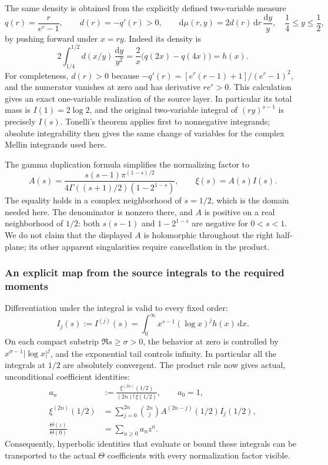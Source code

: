 \documentclass[11pt,a4paper]{article}
\numberwithin{equation}{section}
\theoremstyle{definition}
\theoremstyle{remark}
\begin{document}
The same density is obtained from the explicitly defined two-variable measure
\begin{equation}\label{hyp-eq:gp-pushforward}
q(r)=\frac{r}{e^r-1},\qquad d(r)=-q'(r)>0,\qquad
\mathrm d\mu(r,y)=2d(r)\,\mathrm dr\,\frac{\mathrm dy}{y},
\quad \frac14\leq y\leq\frac12,
\end{equation}
by pushing forward under $x=ry$. Indeed its density is
\[
2\int_{1/4}^{1/2}d(x/y)\,\frac{\mathrm dy}{y^2}
=\frac2x\bigl(q(2x)-q(4x)\bigr)=h(x).
\]
For completeness, $d(r)>0$ because
$-q'(r)=[e^r(r-1)+1]/(e^r-1)^2$, and the numerator vanishes at
zero and has derivative $re^r>0$. This calculation gives an exact
one-variable realization of the source layer. In particular its total
mass is $I(1)=2\log2$, and the original two-variable integral of
$(ry)^{s-1}$ is precisely $I(s)$. Tonelli's theorem applies first to
nonnegative integrands; absolute integrability then gives the same
change of variables for the complex Mellin integrands used here.

The gamma duplication formula \cite{dlmf-duplication} simplifies the
normalizing factor to
\begin{equation}\label{hyp-eq:A}
A(s)=\frac{s(s-1)\pi^{(1-s)/2}}
{4\Gamma((s+1)/2)(1-2^{1-s})},
\qquad \xi(s)=A(s)I(s).
\end{equation}
The equality holds in a complex neighborhood of $s=1/2$, which is
the domain needed here. The denominator is nonzero there, and
$A$ is positive on a real neighborhood of $1/2$: both $s(s-1)$
and $1-2^{1-s}$ are negative for $0<s<1$.
We do not claim that the displayed $A$ is holomorphic throughout
the right half-plane; its other apparent singularities require
cancellation in the product.

\subsubsection{An explicit map from the source integrals to the required moments}

Differentiation under the integral is valid to every fixed order:
\begin{equation}\label{hyp-eq:log-integrals}
I_j(s):=I^{(j)}(s)
=\int_0^\infty x^{s-1}(\log x)^j h(x)\,\mathrm dx.
\end{equation}
On each compact substrip $\Re s\geq\sigma>0$, the behavior at
zero is controlled by $x^{\sigma-1}|\log x|^j$, and the exponential
tail controls infinity. In particular all the integrals at $1/2$
are absolutely convergent. The product rule now gives actual,
unconditional coefficient identities:
\begin{align}
a_n&:=\frac{\xi^{(2n)}(1/2)}{(2n)!\,\xi(1/2)},
\qquad a_0=1,\label{hyp-eq:actual-coefficients}\\
\xi^{(2n)}(1/2)
&=\sum_{j=0}^{2n}\binom{2n}{j}
A^{(2n-j)}(1/2)I_j(1/2),\label{hyp-eq:jet-product}\\
\frac{\Theta(z)}{\Theta(0)}&=\sum_{n\geq0}a_nz^n.
\label{hyp-eq:normalized-theta-series}
\end{align}
Consequently, hyperbolic identities that evaluate or bound these
integrals can be transported to the actual $\Theta$ coefficients
with every normalization factor visible.
\end{document}

